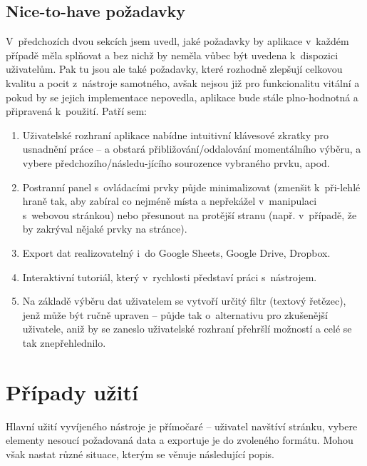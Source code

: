\documentclass[thesis=B,czech]{FITthesis}[2012/06/26]
\begin{document}
\subsection{Nice-to-have požadavky}
V~předchozích dvou sekcích jsem uvedl, jaké požadavky by aplikace v~každém případě měla splňovat a bez nichž by neměla vůbec být uvedena k~dispozici uživatelům. Pak tu jsou ale také požadavky, které rozhodně zlepšují celkovou kvalitu a pocit z~nástroje samotného, avšak nejsou již pro funkcionalitu vitální a pokud by se jejich implementace nepovedla, aplikace bude stále plno-hodnotná a připravená k~použití. Patří sem:
\begin{enumerate}[+1)]
	\item Uživatelské rozhraní aplikace nabídne intuitivní klávesové zkratky pro usnadnění práce -- \textsf{} a \textsf{} obstará přibližování/oddalování momentálního výběru, \textsf{} a \textsf{} vybere předchozího/následu-jícího sourozence vybraného prvku, apod.
	\item Postranní panel s~ovládacími prvky půjde minimalizovat (zmenšit k~při-lehlé hraně tak, aby zabíral co nejméně místa a nepřekážel v~manipulaci s~webovou stránkou) nebo přesunout na protější stranu (např. v~případě, že by zakrýval nějaké prvky na stránce).
	\item Export dat realizovatelný i~do Google Sheets, Google Drive, Dropbox.
	\item Interaktivní tutoriál, který v~rychlosti představí práci s~nástrojem.
	\item Na základě výběru dat uživatelem se vytvoří určitý filtr (textový řetězec), jenž může být ručně upraven -- půjde tak o~alternativu pro zkušenější uživatele, aniž by se zaneslo uživatelské rozhraní přehršlí možností a celé se tak znepřehlednilo.
\end{enumerate}


\section{Případy užití}
\label{sec:use_cases}
Hlavní užití vyvíjeného nástroje je přímočaré -- uživatel navštíví stránku, vybere elementy nesoucí požadovaná data a exportuje je do zvoleného formátu. Mohou však nastat různé situace, kterým se věnuje následující popis.
\end{document}
